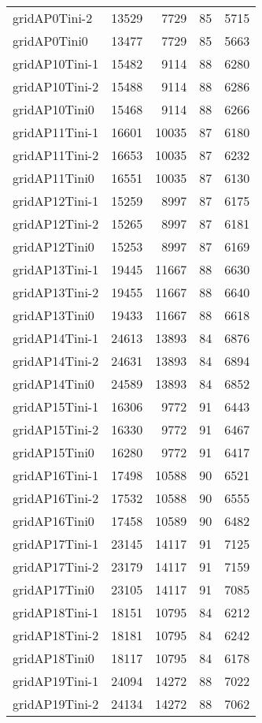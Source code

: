 \begin{longtable}{lrrrr}
gridAP0Tini-2 & 13529 & 7729 & 85 & 5715 \\
gridAP0Tini0 & 13477 & 7729 & 85 & 5663 \\
gridAP10Tini-1 & 15482 & 9114 & 88 & 6280 \\
gridAP10Tini-2 & 15488 & 9114 & 88 & 6286 \\
gridAP10Tini0 & 15468 & 9114 & 88 & 6266 \\
gridAP11Tini-1 & 16601 & 10035 & 87 & 6180 \\
gridAP11Tini-2 & 16653 & 10035 & 87 & 6232 \\
gridAP11Tini0 & 16551 & 10035 & 87 & 6130 \\
gridAP12Tini-1 & 15259 & 8997 & 87 & 6175 \\
gridAP12Tini-2 & 15265 & 8997 & 87 & 6181 \\
gridAP12Tini0 & 15253 & 8997 & 87 & 6169 \\
gridAP13Tini-1 & 19445 & 11667 & 88 & 6630 \\
gridAP13Tini-2 & 19455 & 11667 & 88 & 6640 \\
gridAP13Tini0 & 19433 & 11667 & 88 & 6618 \\
gridAP14Tini-1 & 24613 & 13893 & 84 & 6876 \\
gridAP14Tini-2 & 24631 & 13893 & 84 & 6894 \\
gridAP14Tini0 & 24589 & 13893 & 84 & 6852 \\
gridAP15Tini-1 & 16306 & 9772 & 91 & 6443 \\
gridAP15Tini-2 & 16330 & 9772 & 91 & 6467 \\
gridAP15Tini0 & 16280 & 9772 & 91 & 6417 \\
gridAP16Tini-1 & 17498 & 10588 & 90 & 6521 \\
gridAP16Tini-2 & 17532 & 10588 & 90 & 6555 \\
gridAP16Tini0 & 17458 & 10589 & 90 & 6482 \\
gridAP17Tini-1 & 23145 & 14117 & 91 & 7125 \\
gridAP17Tini-2 & 23179 & 14117 & 91 & 7159 \\
gridAP17Tini0 & 23105 & 14117 & 91 & 7085 \\
gridAP18Tini-1 & 18151 & 10795 & 84 & 6212 \\
gridAP18Tini-2 & 18181 & 10795 & 84 & 6242 \\
gridAP18Tini0 & 18117 & 10795 & 84 & 6178 \\
gridAP19Tini-1 & 24094 & 14272 & 88 & 7022 \\
gridAP19Tini-2 & 24134 & 14272 & 88 & 7062 \\

\end{longtable}
